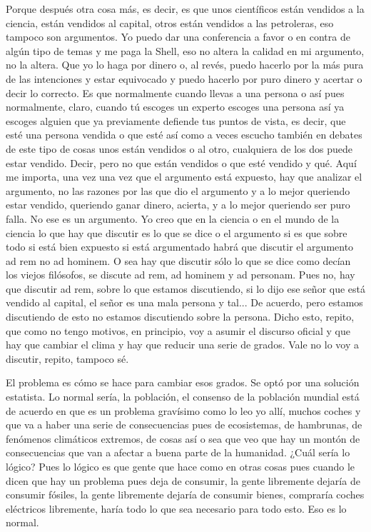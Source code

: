 Porque después otra cosa más, es decir, es que unos científicos están vendidos a la ciencia, están vendidos al capital, otros están vendidos a las petroleras, eso tampoco son argumentos. Yo puedo dar una conferencia a favor o en contra de algún tipo de temas y me paga la Shell, eso no altera la calidad en mi argumento, no la altera. Que yo lo haga por dinero o, al revés, puedo hacerlo por la más pura de las intenciones y estar equivocado y puedo hacerlo por puro dinero y acertar o decir lo correcto. Es que normalmente cuando llevas a una persona o así pues normalmente, claro, cuando tú escoges un experto escoges una persona así ya escoges alguien que ya previamente defiende tus puntos de vista, es decir, que esté una persona vendida o que esté así como a veces escucho también en debates de este tipo de cosas unos están vendidos o al otro, cualquiera de los dos puede estar vendido. Decir, pero no que están vendidos o que esté vendido y qué. Aquí me importa, una vez una vez que el argumento está expuesto, hay que analizar el argumento, no las razones por las que dio el argumento y a lo mejor queriendo estar vendido, queriendo ganar dinero, acierta, y a lo mejor queriendo ser puro falla. No ese es un argumento. Yo creo que en la ciencia o en el mundo de la ciencia lo que hay que discutir es lo que se dice o el argumento si es que sobre todo si está bien expuesto si está argumentado habrá que discutir el argumento ad rem no ad hominem. O sea hay que discutir sólo lo que se dice como decían los viejos filósofos, se discute ad rem, ad hominem y ad personam. Pues no, hay que discutir ad rem, sobre lo que estamos discutiendo, si lo dijo ese señor que está vendido al capital, el señor es una mala persona y tal... De acuerdo, pero estamos discutiendo de esto no estamos discutiendo sobre la persona. Dicho esto, repito, que como no tengo motivos, en principio, voy a asumir el discurso oficial y que hay que cambiar el clima y hay que reducir una serie de grados. Vale no lo voy a discutir, repito, tampoco sé.

El problema es cómo se hace para cambiar esos grados. Se optó por una solución estatista. Lo normal sería, la población, el consenso de la población mundial está de acuerdo en que es un problema gravísimo como lo leo yo allí, muchos coches y que va a haber una serie de consecuencias pues de ecosistemas, de hambrunas, de fenómenos climáticos extremos, de cosas así o sea que veo que hay un montón de consecuencias que van a afectar a buena parte de la humanidad. ¿Cuál sería lo lógico? Pues lo lógico es que gente que hace como en otras cosas pues cuando le dicen que hay un problema pues deja de consumir, la gente libremente dejaría de consumir fósiles, la gente libremente dejaría de consumir bienes, compraría coches eléctricos libremente, haría todo lo que sea necesario para todo esto. Eso es lo normal.

